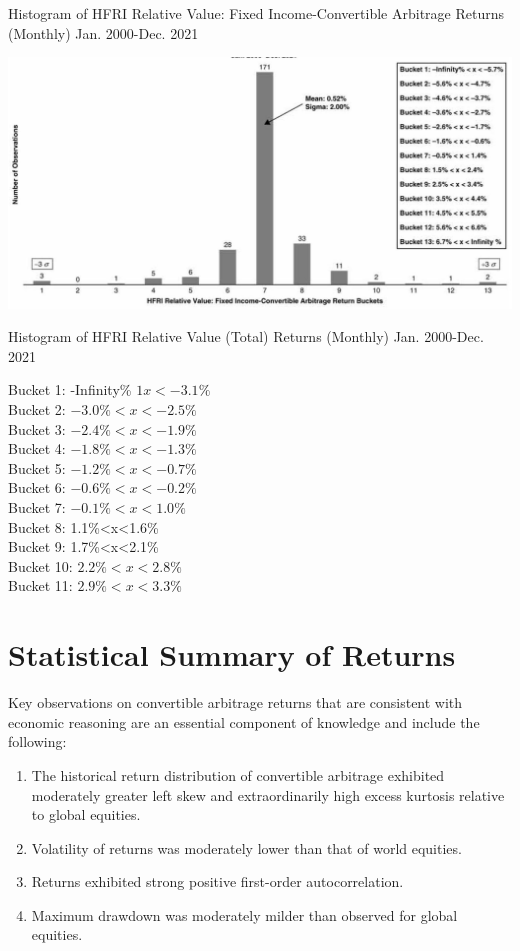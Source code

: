 \documentclass[11pt]{article}
\begin{document}
Histogram of HFRI Relative Value: Fixed Income-Convertible Arbitrage Returns (Monthly) Jan. 2000-Dec. 2021

\begin{center}
\includegraphics[max width=\textwidth]{2024_04_09_d2bdb6aa136bcf7c7f5eg-09(1)}
\end{center}

Histogram of HFRI Relative Value (Total) Returns (Monthly) Jan. 2000-Dec. 2021

Bucket 1: -Infinity\% $1 x<-3.1 \%$\\
Bucket 2: $-3.0 \%<x<-2.5 \%$\\
Bucket 3: $-2.4 \%<x<-1.9 \%$\\
Bucket 4: $-1.8 \%<x<-1.3 \%$\\
Bucket 5: $-1.2 \%<x<-0.7 \%$\\
Bucket 6: $-0.6 \%<x<-0.2 \%$\\
Bucket 7: $-0.1 \%<x<1.0 \%$\\
Bucket 8: 1.1\%<x<1.6\%\\
Bucket 9: 1.7\%<x<2.1\%\\
Bucket 10: $2.2 \%<x<2.8 \%$\\
Bucket 11: $2.9 \%<x<3.3 \%$

\section*{Statistical Summary of Returns}
Key observations on convertible arbitrage returns that are consistent with economic reasoning are an essential component of knowledge and include the following:

\begin{enumerate}
  \item The historical return distribution of convertible arbitrage exhibited moderately greater left skew and extraordinarily high excess kurtosis relative to global equities.

  \item Volatility of returns was moderately lower than that of world equities.

  \item Returns exhibited strong positive first-order autocorrelation.

  \item Maximum drawdown was moderately milder than observed for global equities.

\end{enumerate}
\end{document}
